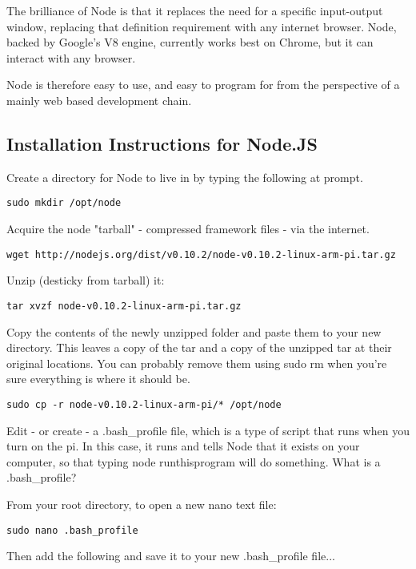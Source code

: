 The brilliance of Node is that it replaces the need for a specific input-output window, replacing that definition requirement with any internet browser. Node, backed by Google's V8 engine, currently works best on Chrome, but it can interact with any browser.

Node is therefore easy to use, and easy to program for from the perspective of a mainly web based development chain. 

\subsection{Installation Instructions for Node.JS}
Create a directory for Node to live in by typing the following at prompt.
\begin{lstlisting}
sudo mkdir /opt/node
\end{lstlisting}

Acquire the node "tarball" - compressed framework files - via the internet.

\begin{lstlisting}
wget http://nodejs.org/dist/v0.10.2/node-v0.10.2-linux-arm-pi.tar.gz
\end{lstlisting}

Unzip (desticky from tarball) it:
\begin{lstlisting}
tar xvzf node-v0.10.2-linux-arm-pi.tar.gz
\end{lstlisting}

Copy the contents of the newly unzipped folder and paste them to your new directory. This leaves a copy of the tar and a copy of the unzipped tar at their original locations. You can probably remove them using sudo rm when you're sure everything is where it should be.

\begin{lstlisting}
sudo cp -r node-v0.10.2-linux-arm-pi/* /opt/node
\end{lstlisting}

Edit - or create - a .bash_profile file, which is a type of script that runs when you turn on the pi. In this case, it runs and tells Node that it exists on your computer, so that typing node runthisprogram will do something. What is a .bash_profile?

From your root directory, to open a new nano text file:
\begin{lstlisting}
sudo nano .bash_profile 
\end{lstlisting}

Then add the following and save it to your new .bash_profile file...

